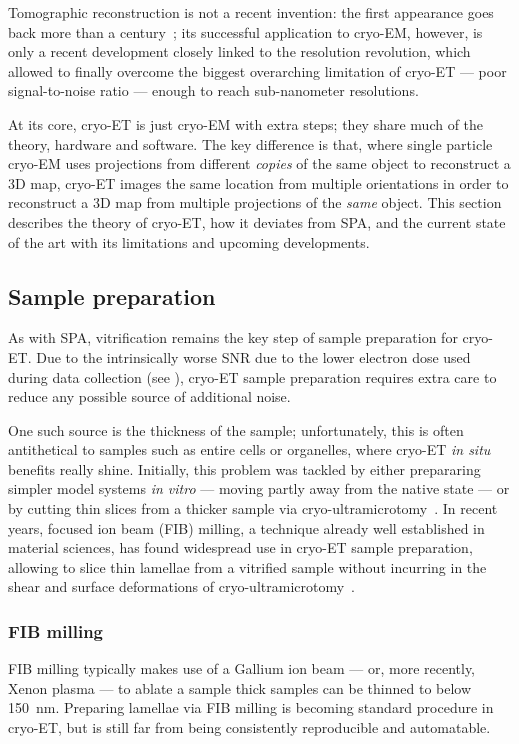 Tomographic reconstruction is not a recent invention: the first appearance goes back more than a century~\cite{jDeterminationFunctionsTheir1917}; its successful application to cryo-EM, however, is only a recent development closely linked to the resolution revolution, which allowed to finally overcome the biggest overarching limitation of cryo-ET --- poor signal-to-noise ratio --- enough to reach sub-nanometer resolutions.

At its core, cryo-ET is just cryo-EM with extra steps; they share much of the theory, hardware and software.
The key difference is that, where single particle cryo-EM uses projections from different \textit{copies} of the same object to reconstruct a 3D map, cryo-ET images the same location from multiple orientations in order to reconstruct a 3D map from multiple projections of the \textit{same} object.
This section describes the theory of cryo-ET, how it deviates from SPA, and the current state of the art with its limitations and upcoming developments.

\subsection{Sample preparation}
As with SPA, vitrification remains the key step of sample preparation for cryo-ET.
Due to the intrinsically worse SNR due to the lower electron dose used during data collection (see ), cryo-ET sample preparation requires extra care to reduce any possible source of additional noise.

One such source is the thickness of the sample; unfortunately, this is often antithetical to samples such as entire cells or organelles, where cryo-ET \textit{in situ} benefits really shine.
Initially, this problem was tackled by either prepararing simpler model systems \textit{in vitro} --- moving partly away from the native state --- or by cutting thin slices from a thicker sample via cryo-ultramicrotomy~\cite{peaseElectronMicroscopyUltramicrotomy1981}.
In recent years, focused ion beam (FIB) milling, a technique already well established in material sciences, has found widespread use in cryo-ET sample preparation, allowing to slice thin lamellae from a vitrified sample without incurring in the shear and surface deformations of cryo-ultramicrotomy~\cite{markoFocusedionbeamThinningFrozenhydrated2007}.

\subsubsection{FIB milling}
FIB milling typically makes use of a Gallium ion beam --- or, more recently, Xenon plasma --- to ablate a sample
thick samples can be thinned to below \qty{150}{\nano\meter}.
Preparing lamellae via FIB milling is becoming standard procedure in cryo-ET, but is still far from being consistently reproducible and automatable.

